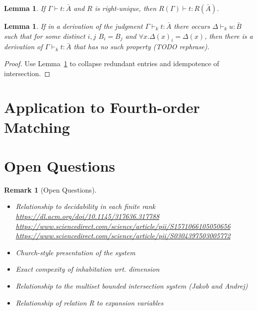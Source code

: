 \documentclass[10pt,a4paper]{article}
\theoremstyle{plain}%
\newtheorem{lemma}[theorem]{Lemma}
\newtheorem{remark}[theorem]{Remark}
\begin{document}
\begin{lemma}
\label{lem:transform}
If $\Gamma \vdash t : \bar{A}$ and $R$ is right-unique, then $R(\Gamma) \vdash t : R(\bar{A})$.
\end{lemma}

\begin{lemma}
If in a derivation of the judgment $\Gamma \vdash_k t : \bar{A}$ there occurs $\Delta \vdash_k u : \bar{B}$ such that for some distinct $i, j$
$B_i = B_j$ and $\forall x.\Delta(x)_i = \Delta(x)$, then there is a derivation of $\Gamma \vdash_k t : \bar{A}$ that has no such property (TODO rephrase).
\end{lemma}

\begin{proof}
Use Lemma~\ref{lem:transform} to collapse redundant entries and idempotence of intersection.
\end{proof}

\newpage

\section{Application to Fourth-order Matching}


\newpage

\section*{Open Questions}
\begin{remark}[Open Questions]
\begin{itemize}
\item Relationship to decidability in each finite rank\\
\url{https://dl.acm.org/doi/10.1145/317636.317788}\\
\url{https://www.sciencedirect.com/science/article/pii/S1571066105050656}\\
\url{https://www.sciencedirect.com/science/article/pii/S0304397503005772}
\item Church-style presentation of the system
\item Exact compexity of inhabitation wrt. dimension
\item Relationship to the multiset bounded intersection system (Jakob and Andrej)
\item Relationship of relation R to expansion variables
\end{itemize}
\end{remark}


\newpage

\printbibliography
\end{document}
